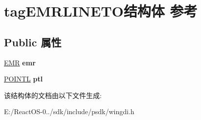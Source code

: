 \hypertarget{structtag_e_m_r_l_i_n_e_t_o}{}\section{tag\+E\+M\+R\+L\+I\+N\+E\+T\+O结构体 参考}
\label{structtag_e_m_r_l_i_n_e_t_o}
\subsection*{Public 属性}
\begin{DoxyCompactItemize}
\item 
\mbox{\label{structtag_e_m_r_l_i_n_e_t_o_a910e08bdeeb9b9f9078f4e1aec1dd8ed}} 
\hyperlink{structtag_e_m_r}{E\+MR} {\bfseries emr}
\item 
\mbox{\label{structtag_e_m_r_l_i_n_e_t_o_a3d849dd8250263ccac6719feec6cfdad}} 
\hyperlink{struct___p_o_i_n_t_l}{P\+O\+I\+N\+TL} {\bfseries ptl}
\end{DoxyCompactItemize}


该结构体的文档由以下文件生成\+:\begin{DoxyCompactItemize}
\item 
E\+:/\+React\+O\+S-\/0../sdk/include/psdk/wingdi.\+h\end{DoxyCompactItemize}
